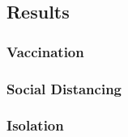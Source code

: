 \subsection{Results}
\subsubsection{Vaccination}
\subsubsection{Social Distancing}
\subsubsection{Isolation}





